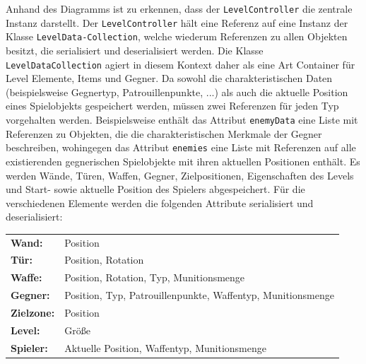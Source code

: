 Anhand des Diagramms ist zu erkennen, dass der \texttt{LevelController} die zentrale Instanz darstellt. Der \texttt{LevelController} hält eine Referenz auf eine Instanz der Klasse \texttt{LevelData-\linebreak Collection}, welche wiederum Referenzen zu allen Objekten besitzt, die serialisiert und deserialisiert werden. Die Klasse \texttt{LevelDataCollection} agiert in diesem Kontext daher als eine Art Container für Level Elemente, Items und Gegner. Da sowohl die charakteristischen Daten (beispielsweise Gegnertyp, Patrouillenpunkte, ...) als auch die aktuelle Position eines Spielobjekts gespeichert werden, müssen zwei Referenzen für jeden Typ vorgehalten werden. Beispielsweise enthält das Attribut \texttt{enemyData} eine Liste mit Referenzen zu Objekten, die die charakteristischen Merkmale der Gegner beschreiben, wohingegen das Attribut \texttt{enemies} eine Liste mit Referenzen auf alle existierenden gegnerischen Spielobjekte mit ihren aktuellen Positionen enthält. Es werden Wände, Türen, Waffen, Gegner, Zielpositionen, Eigenschaften des Levels und Start- sowie aktuelle Position des Spielers abgespeichert. Für die verschiedenen Elemente werden die folgenden Attribute serialisiert und deserialisiert:

\vspace{3mm}
\begin{tabular}[t]{ll}
\textbf{Wand:} & Position\\
\textbf{Tür:} & Position, Rotation\\
\textbf{Waffe:} & Position, Rotation, Typ, Munitionsmenge\\
\textbf{Gegner:} & Position, Typ, Patrouillenpunkte, Waffentyp, Munitionsmenge\\
\textbf{Zielzone:} & Position\\
\textbf{Level:} & Größe\\
\textbf{Spieler:} & Aktuelle Position, Waffentyp, Munitionsmenge
\end{tabular}
\vspace{4mm}


